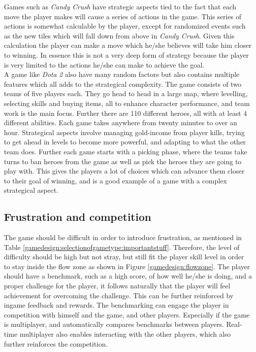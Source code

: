 Games such as \textit{Candy Crush}\cite{candycrush} have strategic aspects tied to the fact that each move the player makes will cause a series of actions in the game.
This series of actions is somewhat calculable by the player, except for randomized events such as the new tiles which will fall down from above in \textit{Candy Crush}.
Given this calculation the player can make a move which he/she believes will take him closer to winning.
In essence this is not a very deep form of strategy because the player is very limited to the actions he/she can make to achieve the goal.\\
A game like \textit{Dota 2}\cite{Dota2} also have many random factors but also contains multiple features which all adds to the strategical complexity.
The game consists of two teams of five players each. 
They go head to head in a large map, where levelling, selecting skills and buying items, all to enhance character performance, and team work is the main focus. 
Further there are 110 different heroes, all with at least 4 different abilities. 
Each game takes anywhere from twenty minutes to over an hour. 
Strategical aspects involve managing gold-income from player kills, trying to get ahead in levels to become more powerful, and adapting to what the other team does. 
Further each game starts with a picking phase, where the teams take turns to ban heroes from the game as well as pick the heroes they are going to play with.
This gives the players a lot of choices which can advance them closer to their goal of winning, and is a good example of a game with a complex strategical aspect.

\subsection{Frustration and competition}
The game should be difficult in order to introduce frustration, as mentioned in Table \ref{gamedesign:selectionofgametype:importantstuff}.
Therefore, the level of difficulty should be high but not stray, but still fit the player skill level in order to stay inside the flow zone as shown in Figure \ref{gamedesign:flowzone}.
The player should have a benchmark, such as a high score, of how well he/she is doing, and a proper challenge for the player, it follows naturally that the player will feel achievement for overcoming the challenge.
This can be further reinforced by ingame feedback and rewards.
The benchmarking can engage the player in competition with himself and the game, and other players.
Especially if the game is multiplayer, and automatically compares benchmarks between players.
Real-time multiplayer also enables interacting with the other players, which also further reinforces the competition.

